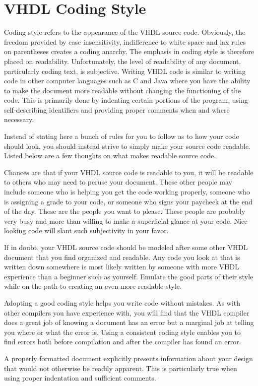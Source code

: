 \section{VHDL Coding Style}
Coding style refers to the appearance of the VHDL source code. Obviously, the freedom provided by case insensitivity, indifference to white space and lax rules on parentheses creates a coding anarchy. The emphasis in coding style is therefore placed on readability. Unfortunately, the level of readability of any document, particularly coding text, is subjective. Writing VHDL code is similar to writing code in other computer languages such as C and Java where you have the ability to make the document more readable without changing the functioning of the code. This is primarily done by indenting certain portions of the program, using self-describing identifiers and providing proper comments when and where necessary.

Instead of stating here a bunch of rules for you to follow as to how your code should look, you should instead strive to simply make your source code readable. Listed below are a few thoughts on what makes readable source code.

\begin{my_list}
\item Chances are that if your VHDL source code is readable to you, it will be readable to others who may need to peruse your document. These other people may include someone who is helping you get the code working properly, someone who is assigning a grade to your code, or someone who signs your paycheck at the end of the day. These are the people you want to please. These people are probably very busy and more than willing to make a superficial glance at your code. Nice looking code will slant such subjectivity in your favor.
\item If in doubt, your VHDL source code should be modeled after some other VHDL document that you find organized and readable. Any code you look at that is written down somewhere is most likely written by someone with more VHDL experience than a beginner such as yourself. Emulate the good parts of their style while on the path to creating an even more readable style.
\item Adopting a good coding style helps you write code without mistakes. As with other compilers you have experience with, you will find that the VHDL compiler does a great job of knowing a document has an error but a marginal job at telling you where or what the error is. Using a consistent coding style enables you to find errors both before compilation and after the compiler has found an error.
\item A properly formatted document explicitly presents information about your design that would not otherwise be readily apparent. This is particularly true when using proper indentation and sufficient comments.
\end{my_list}
\null\newpage
\thispagestyle{empty}
